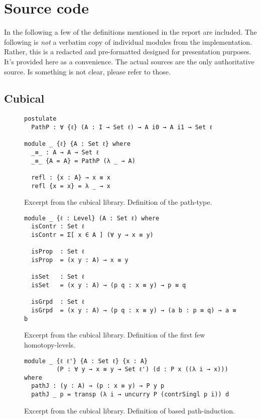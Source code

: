 \chapter{Source code}
\label{ch:app-sources}
In the following a few of the definitions mentioned in the report are included.
The following is \emph{not} a verbatim copy of individual modules from the
implementation. Rather, this is a redacted and pre-formatted designed for
presentation purposes. It's provided here as a convenience. The actual sources
are the only authoritative source. Is something is not clear, please refer to
those.
\clearpage
\section{Cubical}
\label{sec:app-cubical}
\begin{figure}[h]
\label{fig:path}
\begin{Verbatim}
postulate
  PathP : ∀ {ℓ} (A : I → Set ℓ) → A i0 → A i1 → Set ℓ

module _ {ℓ} {A : Set ℓ} where
  _≡_ : A → A → Set ℓ
  _≡_ {A = A} = PathP (λ _ → A)

  refl : {x : A} → x ≡ x
  refl {x = x} = λ _ → x
\end{Verbatim}
\caption{Excerpt from the cubical library. Definition of the path-type.}
\end{figure}
%
\begin{figure}[h]
\begin{Verbatim}
module _ {ℓ : Level} (A : Set ℓ) where
  isContr : Set ℓ
  isContr = Σ[ x ∈ A ] (∀ y → x ≡ y)

  isProp  : Set ℓ
  isProp  = (x y : A) → x ≡ y

  isSet   : Set ℓ
  isSet   = (x y : A) → (p q : x ≡ y) → p ≡ q

  isGrpd  : Set ℓ
  isGrpd  = (x y : A) → (p q : x ≡ y) → (a b : p ≡ q) → a ≡ b
\end{Verbatim}
\caption{Excerpt from the cubical library. Definition of the first few
  homotopy-levels.}
\end{figure}
%
\begin{figure}[h]
\begin{Verbatim}
module _ {ℓ ℓ'} {A : Set ℓ} {x : A}
         (P : ∀ y → x ≡ y → Set ℓ') (d : P x ((λ i → x))) where
  pathJ : (y : A) → (p : x ≡ y) → P y p
  pathJ _ p = transp (λ i → uncurry P (contrSingl p i)) d
\end{Verbatim}
\clearpage
\caption{Excerpt from the cubical library. Definition of based path-induction.}
\end{figure}
